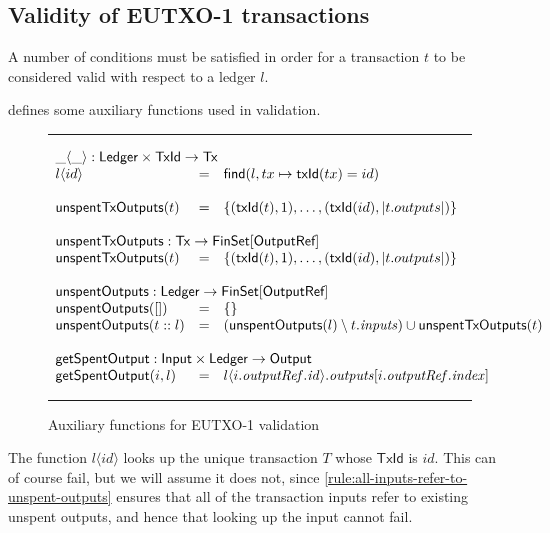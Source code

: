 \documentclass[a4paper]{article}
\newcommand{\s}{\textsf}  %
\newcommand{\msf}[1]{\ensuremath{\mathsf{#1}}}
\newcommand{\mi}[1]{\ensuremath{\mathit{#1}}}
\newcommand\rfskip{7pt}
\newenvironment{ruledfigure}[1]{\begin{figure}[#1]\hrule\vspace{\rfskip}}{\vspace{\rfskip}\hrule\end{figure}}
\newcommand{\FinSet}[1]{\ensuremath{\s{FinSet}[#1]}}
\newcommand{\TxId}{\ensuremath{\s{TxId}}}
\newcommand{\txId}{\msf{txId}}
\newcommand{\idx}{\mi{index}}
\newcommand{\inputs}{\mi{inputs}}
\newcommand{\outputs}{\mi{outputs}}
\newcommand{\outputref}{\mi{outputRef}}
\newcommand{\id}{\mi{id}}
\newcommand{\lookupTx}[2]{#1\langle#2\rangle}
\newcommand{\getSpent}{\msf{getSpentOutput}}
\newcommand{\unspent}{\msf{unspentOutputs}}
\newcommand{\txunspent}{\msf{unspentTxOutputs}}
\newcommand{\eutxotx}{\msf{Tx}}
\newcommand{\emptymap}{\ensuremath{\{\}}}
\begin{document}
\subsection{Validity of EUTXO-1 transactions}
\label{sec:eutxo-1-validity}
A number of conditions must be satisfied in order for a transaction
$t$ to be considered valid with respect to a ledger $l$.

 defines some auxiliary functions used in validation.
\begin{ruledfigure}{H}
  \begin{displaymath}
  \begin{array}{lll}
  \multicolumn{3}{l}{\lookupTx{\_}{\_} : \s{Ledger} \times \TxId \rightarrow \eutxotx{}}\\
  \lookupTx{l}{id} &=& \textsf{find}(l, tx \mapsto \txId(tx) = id)\\
  \\
  \txunspent(t) &=& \{(\txId(t),1), \ldots, (\txId(id),\left|t.outputs\right|)\}\\
  \\
  \multicolumn{3}{l}{\txunspent : \eutxotx \rightarrow \FinSet{\s{OutputRef}}}\\
  \txunspent(t) &=& \{(\txId(t),1), \ldots, (\txId(id),\left|t.outputs\right|)\}\\
  \\
  \multicolumn{3}{l}{\unspent : \s{Ledger} \rightarrow \FinSet{\s{OutputRef}}}\\
  \unspent([]) &=& \emptymap \\
  \unspent(t::l) &=& (\unspent(l) \setminus t.\inputs) \cup \txunspent(t)\\
  \\
  \multicolumn{3}{l}{\getSpent : \s{Input} \times \s{Ledger} \rightarrow \s{Output}}\\
  \getSpent(i,l) &=& l\langle i.\outputref.\id \rangle.\outputs[i.\outputref.\idx]
  \end{array}
  \end{displaymath}
  \caption{Auxiliary functions for EUTXO-1 validation}
  \label{fig:validation-functions-1}
\end{ruledfigure}

\noindent The function $\lookupTx{l}{id}$ looks up the unique transaction
$T$ whose $\TxId$ is $id$. This can of course fail, but we will assume it does
not, since \cref{rule:all-inputs-refer-to-unspent-outputs} ensures that all
of the transaction inputs refer to existing unspent outputs, and hence that
looking up the input cannot fail.
\end{document}
